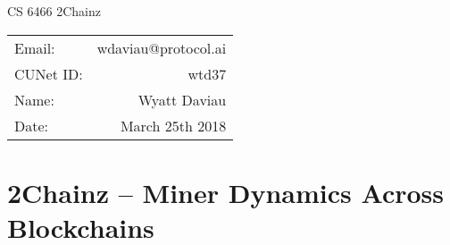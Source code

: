 \documentclass[10pt, preprint]{aastex}
\begin{document}
\begin{center}
{\Large CS 6466 2Chainz}


\begin{tabular}{lr}
Email: & wdaviau@protocol.ai \\
CUNet ID: & wtd37 \\
Name: & Wyatt Daviau \\
Date: & March 25th 2018 \\
\end{tabular}
\end{center}



\section{2Chainz -- Miner Dynamics Across Blockchains}
\end{document}
